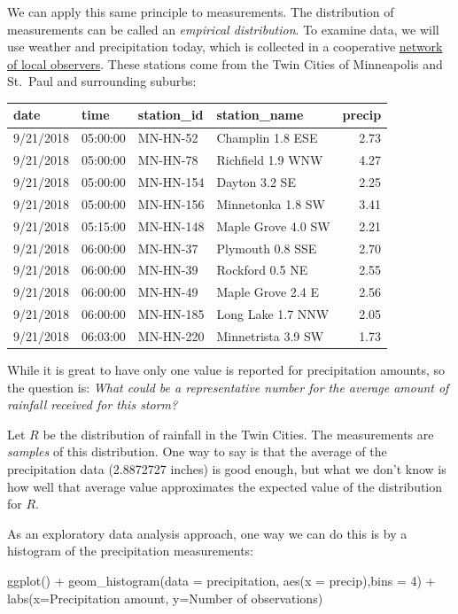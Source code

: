 \documentclass[
]{book}
\newenvironment{Shaded}{\begin{snugshade}}{\end{snugshade}}
\newcommand{\AttributeTok}[1]{\textcolor[rgb]{0.77,0.63,0.00}{#1}}
\newcommand{\DecValTok}[1]{\textcolor[rgb]{0.00,0.00,0.81}{#1}}
\newcommand{\FunctionTok}[1]{\textcolor[rgb]{0.00,0.00,0.00}{#1}}
\newcommand{\NormalTok}[1]{#1}
\newcommand{\SpecialCharTok}[1]{\textcolor[rgb]{0.00,0.00,0.00}{#1}}
\newcommand{\StringTok}[1]{\textcolor[rgb]{0.31,0.60,0.02}{#1}}
\theoremstyle{definition}
\theoremstyle{definition}
\theoremstyle{definition}
\theoremstyle{remark}
\begin{document}
We can apply this same principle to measurements. The distribution of measurements can be called an \emph{empirical distribution}. To examine data, we will use weather and precipitation today, which is collected in a cooperative \href{https://www.cocorahs.org/ViewData/ListDailyPrecipReports.aspx}{network of local observers}. These stations come from the Twin Cities of Minneapolis and St.~Paul and surrounding suburbs:

\begin{tabular}{l|l|l|l|r}
\hline
date & time & station\_id & station\_name & precip\\
\hline
9/21/2018 & 05:00:00 & MN-HN-52 & Champlin 1.8 ESE & 2.73\\
\hline
9/21/2018 & 05:00:00 & MN-HN-78 & Richfield 1.9 WNW & 4.27\\
\hline
9/21/2018 & 05:00:00 & MN-HN-154 & Dayton 3.2 SE & 2.25\\
\hline
9/21/2018 & 05:00:00 & MN-HN-156 & Minnetonka 1.8 SW & 3.41\\
\hline
9/21/2018 & 05:15:00 & MN-HN-148 & Maple Grove 4.0 SW & 2.21\\
\hline
9/21/2018 & 06:00:00 & MN-HN-37 & Plymouth 0.8 SSE & 2.70\\
\hline
9/21/2018 & 06:00:00 & MN-HN-39 & Rockford 0.5 NE & 2.55\\
\hline
9/21/2018 & 06:00:00 & MN-HN-49 & Maple Grove 2.4 E & 2.56\\
\hline
9/21/2018 & 06:00:00 & MN-HN-185 & Long Lake 1.7 NNW & 2.05\\
\hline
9/21/2018 & 06:03:00 & MN-HN-220 & Minnetrista 3.9 SW & 1.73\\
\hline
\end{tabular}

While it is great to have only one value is reported for precipitation amounts, so the question is:
\emph{What could be a representative number for the average amount of rainfall received for this storm?}

Let \(R\) be the distribution of rainfall in the Twin Cities. The measurements are \emph{samples} of this distribution. One way to say is that the average of the precipitation data (2.8872727 inches) is good enough, but what we don't know is how well that average value approximates the expected value of the distribution for \(R\).

As an exploratory data analysis approach, one way we can do this is by a histogram of the precipitation measurements:

\begin{Shaded}
\begin{Highlighting}[]
\FunctionTok{ggplot}\NormalTok{() }\SpecialCharTok{+} 
  \FunctionTok{geom\_histogram}\NormalTok{(}\AttributeTok{data =}\NormalTok{ precipitation, }\FunctionTok{aes}\NormalTok{(}\AttributeTok{x =}\NormalTok{ precip),}\AttributeTok{bins =} \DecValTok{4}\NormalTok{) }\SpecialCharTok{+}
  \FunctionTok{labs}\NormalTok{(}\AttributeTok{x=}\StringTok{\textquotesingle{}Precipitation amount\textquotesingle{}}\NormalTok{,}
       \AttributeTok{y=}\StringTok{\textquotesingle{}Number of observations\textquotesingle{}}\NormalTok{)}
\end{Highlighting}
\end{Shaded}
\end{document}
